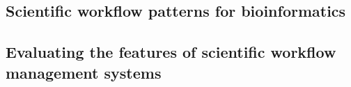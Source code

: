\documentclass[a4paper,10pt]{scrreprt} \usepackage[utf8]{inputenc}
\begin{document}
\subsection{Scientific workflow patterns for bioinformatics}
\label{sec:workflow_patterns}
\subsection{Evaluating the features of scientific workflow management systems}
\label{sec:eval_swms_features}
%
%
%
%
%
%
%
%
\end{document}

